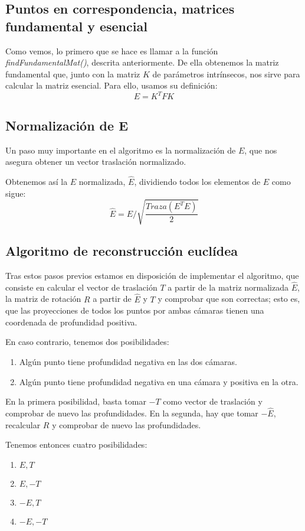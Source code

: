 \documentclass[a4paper, 11pt]{article}
\theoremstyle{definition}
\theoremstyle{theorem}
\begin{document}
    \subsection{Puntos en correspondencia, matrices fundamental y esencial}
    Como vemos, lo primero que se hace es llamar a la función \emph{findFundamentalMat()}, descrita anteriormente. De ella obtenemos la matriz fundamental que, junto con la matriz $K$ de parámetros intrínsecos, nos sirve para calcular la matriz esencial. Para ello, usamos su definición:
    \[
    E  = K^TFK
    \]

    \subsection{Normalización de E}
    Un paso muy importante en el algoritmo es la normalización de $E$, que nos asegura obtener un vector traslación normalizado.

    Obtenemos así la $E$ normalizada, $\hat{E}$, dividiendo todos los elementos de $E$ como sigue:
    \[
    \hat{E} = E / \sqrt{\frac{Traza(E^TE)}{2}}
    \]

    \subsection{Algoritmo de reconstrucción euclídea}
    Tras estos pasos previos estamos en disposición de implementar el algoritmo, que consiste en calcular el vector de traslación $T$ a partir de la matriz normalizada $\hat{E}$, la matriz de rotación $R$ a partir de $\hat{E}$ y $T$ y comprobar que son correctas; esto es, que las proyecciones de todos los puntos por ambas cámaras tienen una coordenada de profundidad positiva.

    En caso contrario, tenemos dos posibilidades:
    \begin{enumerate}
        \item Algún punto tiene profundidad negativa en las dos cámaras.
        \item Algún punto tiene profundidad negativa en una cámara y positiva en la otra.
    \end{enumerate}

    En la primera posibilidad, basta tomar $-T$ como vector de traslación y comprobar de nuevo las profundidades. En la segunda, hay que tomar $-\hat{E}$, recalcular $R$ y comprobar de nuevo las profundidades.

    Tenemos entonces cuatro posibilidades:
    \begin{enumerate}
        \item $E,T$
        \item $E,-T$
        \item $-E,T$
        \item $-E,-T$
    \end{enumerate}
\end{document}
